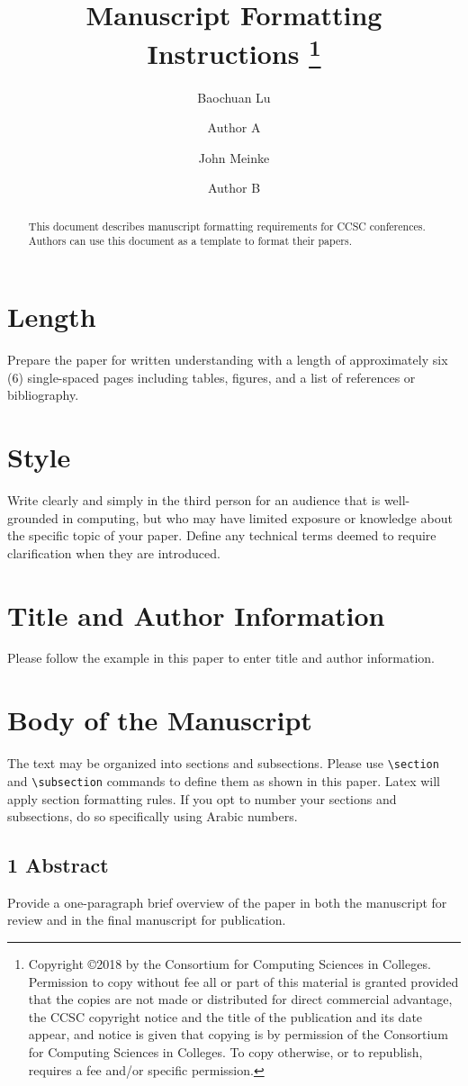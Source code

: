 \documentclass[10pt]{article}
\title{Manuscript Formatting Instructions
\footnote{
Copyright \copyright 2018 by the Consortium for Computing Sciences in Colleges. Permission to copy without fee all or part of this material is granted provided that the copies are not made or distributed for direct commercial advantage, the CCSC copyright notice and the title of the publication and its date appear, and notice is given that copying is by permission of the Consortium for Computing Sciences in Colleges. To copy otherwise, or to republish, requires a fee and/or specific permission.}}
\date{\vspace{-7ex}}
\author[1]{Baochuan Lu}
\author[1]{Author A}
\author[2]{John Meinke}
\author[2]{Author B}
\affil[1]{\footnotesize
Computer and Information Sciences \protect\\
Southwest Baptist University \protect\\
Bolivar, MO 65613}
\affil[ ]{\textit {\{blu,auther\}@sbuniv.edu}}
\affil[2]{\footnotesize
Computer Science Department \protect\\
Excellent University \protect\\ Our Town, TX 00000}
\affil[ ]{\textit {\{email1,email2,email3,email4,email5\}@xyz.edu}}
\begin{document}
\maketitle

\begin{abstract}
This document describes manuscript formatting requirements for CCSC conferences. Authors can use this document as a template to format their papers.
\end{abstract}

\section*{Length}
Prepare the paper for written understanding with a length of approximately six (6) single-spaced pages including tables, figures, and a list of references or bibliography.

\section*{Style}
Write clearly and simply in the third person for an audience that is well-grounded in computing, but who may have limited exposure or knowledge about the specific topic of your paper. Define any technical terms deemed to require clarification when they are introduced.

\section*{Title and Author Information}
Please follow the example in this paper to enter title and author information.

\section*{Body of the Manuscript}
The text may be organized into sections and subsections. Please use \verb+\section+ and  \verb+\subsection+ commands to define them as shown in this paper. Latex will apply section formatting rules. If you opt to number your sections and subsections, do so specifically using Arabic numbers.

\subsection*{1 Abstract}
Provide a one-paragraph brief overview of the paper in both the manuscript for review and in the final manuscript for publication.
\end{document}
